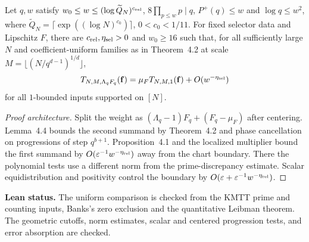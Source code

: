 \begin{theorem}\label{t:relative-selector-comparison}
\leanok
{}
Let $q,w$ satisfy $w_0\le w\le(\log\widetilde Q_N)^{c_{\rm rel}}$,
$8\prod_{p\le w}p\mid q$, $P^+(q)\le w$ and $\log q\le w^2$,
where $\widetilde Q_N=\lceil\exp((\log N)^{c_0})\rceil$,
$0<c_0<1/11$. For fixed selector data and Lipschitz $F$,
there are $c_{\rm rel},\eta_{\rm sel}>0$ and $w_0\ge16$ such that,
for all sufficiently large $N$ and coefficient-uniform families as in
Theorem~4.2 at scale $M=\lfloor(N/q^{d-1})^{1/d}\rfloor$,
\[
 T_{N,M,\Lambda_qF_q}(\mathbf f)
 =\mu_F T_{N,M,1}(\mathbf f)+O(w^{-\eta_{\rm sel}})
\]
for all $1$-bounded inputs supported on $[N]$.
\end{theorem}
\begin{proof}[Proof architecture]
\leanok
Split the weight as $(\Lambda_q-1)F_q+(F_q-\mu_F)$ after centering.
Lemma~4.4 bounds the second summand by Theorem~4.2 and phase cancellation
on progressions of step $q^{b+1}$. Proposition~4.1 and the localized
multiplier bound the first summand by $O(\varepsilon^{-1}w^{-\eta_{\rm rel}})$
away from the chart boundary. There the polynomial tests use a
different norm from the prime-discrepancy estimate. Scalar
equidistribution and positivity control the boundary by
$O(\varepsilon+\varepsilon^{-1}w^{-\eta_{\rm rel}})$.
\end{proof}
\noindent\textbf{Lean status.} The uniform comparison is checked from
the KMTT prime and counting inputs, Banks's zero exclusion and the
quantitative Leibman theorem. The geometric cutoffs, norm estimates,
scalar and centered progression tests, and error absorption are checked.


